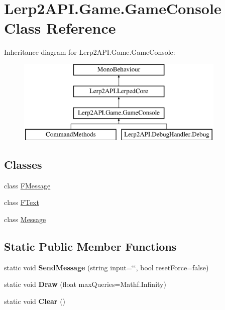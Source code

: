 \hypertarget{class_lerp2_a_p_i_1_1_game_1_1_game_console}{}\section{Lerp2\+A\+P\+I.\+Game.\+Game\+Console Class Reference}
\label{class_lerp2_a_p_i_1_1_game_1_1_game_console}
Inheritance diagram for Lerp2\+A\+P\+I.\+Game.\+Game\+Console\+:\begin{figure}[H]
\begin{center}
\leavevmode
\includegraphics[height=4.000000cm]{class_lerp2_a_p_i_1_1_game_1_1_game_console}
\end{center}
\end{figure}
\subsection*{Classes}
\begin{DoxyCompactItemize}
\item 
class \hyperlink{class_lerp2_a_p_i_1_1_game_1_1_game_console_1_1_f_message}{F\+Message}
\item 
class \hyperlink{class_lerp2_a_p_i_1_1_game_1_1_game_console_1_1_f_text}{F\+Text}
\item 
class \hyperlink{class_lerp2_a_p_i_1_1_game_1_1_game_console_1_1_message}{Message}
\end{DoxyCompactItemize}
\subsection*{Static Public Member Functions}
\begin{DoxyCompactItemize}
\item 
\mbox{\label{class_lerp2_a_p_i_1_1_game_1_1_game_console_ac033b4cf507be1588339059c3c466ea3}} 
static void {\bfseries Send\+Message} (string input=\char`\"{}\char`\"{}, bool reset\+Force=false)
\item 
\mbox{\label{class_lerp2_a_p_i_1_1_game_1_1_game_console_a1cb8971ac1e38f65234bea0d17429acb}} 
static void {\bfseries Draw} (float max\+Queries=Mathf.\+Infinity)
\item 
\mbox{\label{class_lerp2_a_p_i_1_1_game_1_1_game_console_acf996b54c85610e97ecc7aa094860e8b}} 
static void {\bfseries Clear} ()
\end{DoxyCompactItemize}

